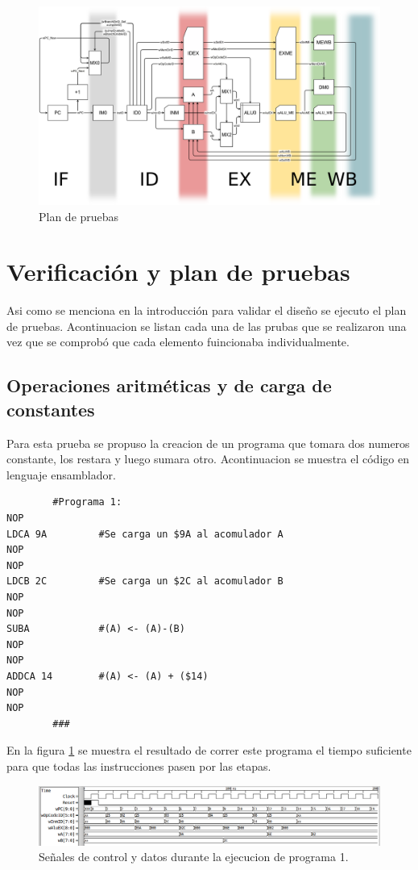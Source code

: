 \documentclass[paper=letter, fontsize=12pt]{article}
\begin{document}
\begin{figure}[hbtp]
\centering
\includegraphics[width=1\linewidth]{araucaria_pipeline}
\caption{Plan de pruebas}
\end{figure}

\section{Verificación y plan de pruebas}

Asi como se menciona en la introducción para validar el diseño se ejecuto el plan de pruebas. Acontinuacion se listan cada una de las prubas que se realizaron una vez que se comprobó que cada elemento fuincionaba individualmente.

\subsection{Operaciones aritméticas y de carga de constantes}
Para esta prueba se propuso la creacion de un programa que tomara dos numeros constante, los restara y luego sumara otro. Acontinuacion se muestra el código en lenguaje ensamblador.

\begin{lstlisting}
		#Programa 1:
NOP
LDCA 9A			#Se carga un $9A al acomulador A
NOP
NOP
LDCB 2C			#Se carga un $2C al acomulador B
NOP
NOP
SUBA			#(A) <- (A)-(B)
NOP
NOP
ADDCA 14		#(A) <- (A) + ($14)
NOP
NOP
		###
\end{lstlisting}

En la figura \ref{i:p1} se muestra el resultado de correr este programa el tiempo suficiente para que todas las instrucciones pasen por las etapas.\\

\begin{figure}[hbtp]
\centering
\includegraphics[width=1\linewidth]{../media/Prog1.png}
\caption{Señales de control y datos durante la ejecucion de programa 1.}
\label{i:p1}
\end{figure}
\end{document}
